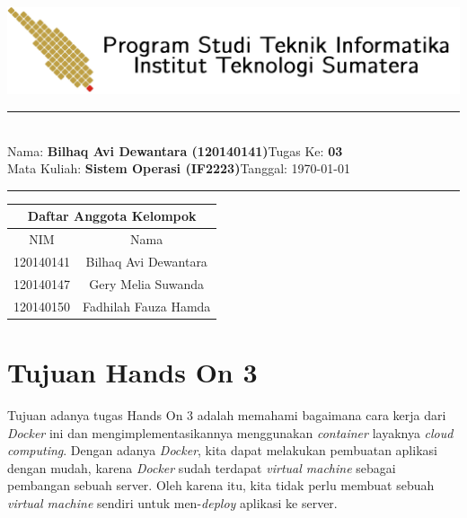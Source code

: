 \documentclass[11pt,a4paper]{article}
\newcommand{\stuid}{120140141}
\newcommand{\student}{\textbf{Bilhaq Avi Dewantara (\stuid{})}}
\newcommand{\course}{\textbf{Sistem Operasi (IF2223)}}
\newcommand{\assignment}{\textbf{03}} %
\begin{document}
\thispagestyle{empty}
\begin{center}
	\includegraphics[scale = 0.15]{Figures/ifitera-header.png}
	\vspace{0.1cm}
\end{center}
{\large
\rule{17cm}{0.2cm}\\[0.3cm]
Nama: \student \hfill Tugas Ke: \assignment\\[0.1cm]
Mata Kuliah: \course \hfill Tanggal: \today\\
\rule{17cm}{0.05cm}
\vspace{0.1cm}
}


\begin{center}
    \begin{tabular}{ |c|c| }
     \hline
     \multicolumn{2}{|c|}{\textbf{Daftar Anggota Kelompok}} \\
     \hline
     NIM & Nama \\
     \hline
     120140141 & Bilhaq Avi Dewantara \\ 
     120140147 & Gery Melia Suwanda \\ 
     120140150 & Fadhilah Fauza Hamda \\
     \hline
    \end{tabular}
    \end{center}

\section{Tujuan Hands On 3}
    Tujuan adanya tugas Hands On 3 adalah memahami bagaimana cara kerja dari \textit{Docker} ini dan mengimplementasikannya 
    menggunakan \textit{container} layaknya \textit{cloud computing}. Dengan adanya \textit{Docker}, kita dapat melakukan
    pembuatan aplikasi dengan mudah, karena \textit{Docker} sudah terdapat \textit{virtual machine} sebagai pembangan sebuah 
    server. Oleh karena itu, kita tidak perlu membuat sebuah \textit{virtual machine} sendiri untuk men-\textit{deploy} aplikasi 
    ke server. 
\end{document}

